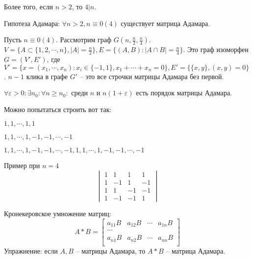 \documentclass[document.tex]{subfiles}
\begin{document}
Более того, если $n > 2$, то $4 | n$.

Гипотеза Адамара: $\forall n > 2, n \equiv 0 (4)$ существует матрица Адамара.

Пусть $n \equiv 0 (4)$. Рассмотрим граф $G(n, \frac{n}{2}, \frac{n}{4})$. $V = \{A \subset \{1, 2, \cdots, n\}, |A| =
\frac{n}{2} \}, E = \{(A, B): |A \cap B| = \frac{n}{4}\}$. Это граф изоморфен $G = (V', E')$, где $V' = \{x = (x_1,
    \cdots, x_n) : x_i \in \{-1, 1\}, x_1 + \cdots + x_n = 0\}, E' = \{\{x, y\}, (x, y) = 0\}$. $n - 1$ клика в графе
    $G'$ -- это все строчки матрицы Адамара без первой.

\begin{theorem}
    $\forall \varepsilon > 0: \exists n_0: \forall n \geq n_0:$ среди $n$ и $n(1 + \varepsilon)$ есть порядок матрицы
    Адамара.
\end{theorem}

Можно попытаться строить вот так:

$1, 1, \cdots, 1, 1$

$1, 1, \cdots, 1, -1, -1, \cdots, -1$

$1, 1, \cdots, 1, -1, -1, \cdots, -1, 1, 1, \cdots, 1, -1, -1, \cdots, -1$

Пример при $n = 4$
\[
    \begin{vmatrix}
        1 & 1 & 1 & 1 \\
        1 & -1 & 1 & -1 \\
        1 & 1 & -1 & -1 \\
        1 & -1 & -1 & 1
    \end{vmatrix}
\]

Кронекеровское умножение матриц:
\[
    A * B = 
    \begin{bmatrix}
        a_{11}B & a_{12}B & \cdots & a_{1n}B \\
        \cdots \\
        a_{n1}B & a_{n2}B & \cdots & a_{nn}B \\
    \end{bmatrix}
\]
Упражнение: если $A, B$ -- матрицы Адамара, то $A * B$ -- матрица Адамара.
\end{document}
